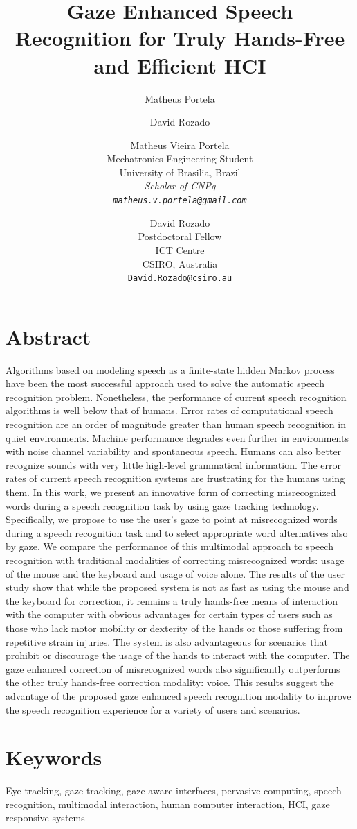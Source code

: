 \documentclass[]{article}
\title{Gaze Enhanced Speech Recognition for Truly Hands-Free and Efficient HCI}
\author{Matheus Portela}
\author{David Rozado}
\author{
  Matheus Vieira Portela\\
  Mechatronics Engineering Student\\
  University of Brasilia, Brazil\\
  \em{Scholar of CNPq}\\
  \texttt{matheus.v.portela@gmail.com}\\
  \and
  David Rozado\\
  Postdoctoral Fellow\\
  ICT Centre\\
  CSIRO, Australia\\
  \texttt{David.Rozado@csiro.au}
}
\begin{document}
\maketitle

\section{Abstract}
Algorithms based on modeling speech as a finite-state hidden Markov process have been the most successful approach used
to solve the automatic speech recognition problem. Nonetheless, the performance of current speech recognition algorithms
is well below that of humans. Error rates of computational speech recognition are an order of magnitude greater than
human speech recognition in quiet environments. Machine performance degrades even further in environments with noise
channel variability and spontaneous speech. Humans can also better recognize sounds with very little high-level
grammatical information. The error rates of current speech recognition systems are frustrating for the humans using
them. In this work, we present an innovative form of correcting misrecognized words during a speech recognition task by
using gaze tracking technology. Specifically, we propose to use the user's gaze to point at misrecognized words during a
speech recognition task and to select appropriate word alternatives also by gaze. We compare  the performance of this
multimodal approach to speech recognition with traditional modalities of correcting misrecognized words: usage of the
mouse and the keyboard and usage of voice alone. The results of the user study show that while the proposed system is
not as fast as using the mouse and the keyboard for correction, it remains a truly hands-free means of interaction with the
computer with obvious advantages for certain types of users such as those who lack  motor mobility or dexterity of the
hands or those suffering from repetitive strain injuries. The system is also advantageous for scenarios that prohibit or
discourage the usage of the hands to interact with the computer. The gaze enhanced correction of misrecognized words
also significantly outperforms the other truly hands-free correction modality: voice. This results suggest the advantage
of the proposed gaze enhanced speech recognition modality to improve the speech recognition experience for a variety of
users and scenarios.


\section{Keywords}
Eye tracking, gaze tracking, gaze aware interfaces, pervasive computing, speech recognition, multimodal interaction,
human computer interaction, HCI, gaze responsive systems 
\end{document}
